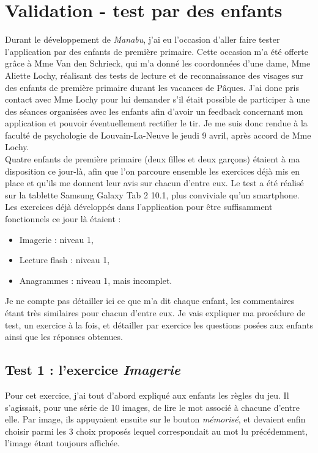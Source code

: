 \section{Validation - test par des enfants \label{testEnfants}}
Durant le développement de \textit{Manabu}, j'ai eu l'occasion d'aller faire tester l'application par des enfants de première primaire. Cette occasion m'a été offerte grâce à Mme Van den Schrieck, qui m'a donné les coordonnées d'une dame, Mme Aliette Lochy, réalisant des tests de lecture et de reconnaissance des visages sur des enfants de première primaire durant les vacances de Pâques. J'ai donc pris contact avec Mme Lochy pour lui demander s'il était possible de participer à une des séances organisées avec les enfants afin d'avoir un feedback concernant mon application et pouvoir éventuellement rectifier le tir. Je me suis donc rendue à la faculté de psychologie de Louvain-La-Neuve le jeudi 9 avril, après accord de Mme Lochy.\\

Quatre enfants de première primaire (deux filles et deux garçons) étaient à ma disposition ce jour-là, afin que l'on parcoure ensemble les exercices déjà mis en place et qu'ils me donnent leur avis sur chacun d'entre eux. Le test a été réalisé sur la tablette Samsung Galaxy Tab 2 10.1, plus conviviale qu'un smartphone. Les exercices déjà développés dans l'application pour être suffisamment fonctionnels ce jour là étaient :
\begin{itemize}
\item Imagerie : niveau 1,
\item Lecture flash : niveau 1,
\item Anagrammes : niveau 1, mais incomplet.
\end{itemize}
Je ne compte pas détailler ici ce que m'a dit chaque enfant, les commentaires étant très similaires pour chacun d'entre eux. Je vais expliquer ma procédure de test, un exercice à la fois, et détailler par exercice les questions posées aux enfants ainsi que les réponses obtenues.

\subsection{Test 1 : l'exercice \textit{Imagerie}}
Pour cet exercice, j'ai tout d'abord expliqué aux enfants les règles du jeu. Il s'agissait, pour une série de 10 images, de lire le mot associé à chacune d'entre elle. Par image, ils appuyaient ensuite sur le bouton \textit{mémorisé}, et devaient enfin choisir parmi les 3 choix proposés lequel correspondait au mot lu précédemment, l'image étant toujours affichée.\\

